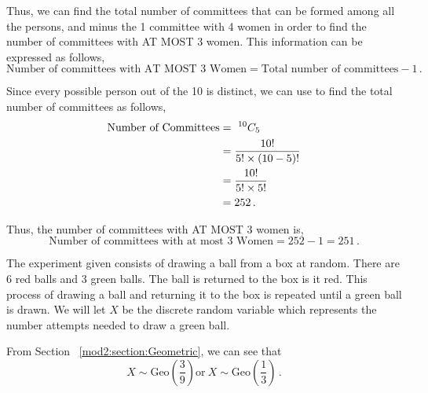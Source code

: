 \begin{subquestions}
Thus, we can find the total number of committees that can be formed among all the persons, and minus the 1 committee with 4 women in order to find the number of committees with AT MOST 3 women. This information can be expressed as follows,
\begin{equation}
  	\text{Number of committees with AT MOST 3 Women} = \text{Total number of committees} - 1 \,.
\end{equation}

Since every possible person out of the 10 is distinct, we can use  to find the total number of committees as follows,
\begin{align}
	\text{Number of Committees} & = ~ ^{10}C_5 \nonumber \\
	                            & = \frac{10!}{5!\times (10-5)!} \nonumber \\
	                            & = \frac{10!}{5! \times 5!} \nonumber \\
	                            & = 252 \,.
\end{align}

Thus, the number of committees with AT MOST 3 women is,
\begin{equation}
	\text{Number of committees with at most 3 Women} = 252 - 1 = 251 \,.
\end{equation}


\subquestion

The experiment given consists of drawing a ball from a box at random. There are 6 red balls and 3 green balls. The ball is returned to the box is it red. This process of drawing a ball and returning it to the box is repeated until a green ball is drawn. We will let $X$ be the discrete random variable which represents the number attempts needed to draw a green ball.

\begin{subsubquestions}
	
\subsubquestion

From Section ~\ref{mod2:section:Geometric}, we can see that
\begin{equation}
	X \sim \text{Geo} \left(\frac{3}{9}\right) \text{or} ~ X \sim \text{Geo} \left(\frac{1}{3}\right) \,.
\end{equation}



\end{subsubquestions}
\end{subquestions}
